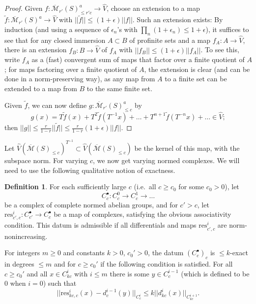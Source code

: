 \documentclass[11pt]{amsbook}
\renewcommand*{\tilde}{\widetilde}
\numberwithin{equation}{section}
\numberwithin{theorem}{section}
\theoremstyle{definition}
\newtheorem{definition}[theorem]{Definition}
\begin{document}
\begin{proof} Given $f: \overline{\mathcal M}_{r'}(S)_{\leq r'c}^a\to \widehat{V}$, choose an extension to a map $\tilde{f}: \overline{\mathcal M}_{r'}(S)^a\to \widehat{V}$ with $||\tilde{f}||\leq (1+\epsilon)||f||$. Such an extension exists: By induction (and using a sequence of $\epsilon_n$'s with $\prod_n (1+\epsilon_n)\leq 1+\epsilon$), it suffices to see that for any closed immersion $A\subset B$ of profinite sets and a map $f_A: A\to \widehat{V}$, there is an extension $f_B: B\to \widehat{V}$ of $f_A$ with $||f_B||\leq (1+\epsilon)||f_A||$. To see this, write $f_A$ as a (fast) convergent sum of maps that factor over a finite quotient of $A$; for maps factoring over a finite quotient of $A$, the extension is clear (and can be done in a norm-preserving way), as any map from $A$ to a finite set can be extended to a map from $B$ to the same finite set.

Given $\tilde{f}$, we can now define $g: \overline{\mathcal M}_{r'}(S)_{\leq c}^a$ by
\[
g(x) = T\tilde{f}(x)+T^2\tilde{f}(T^{-1}x)+\ldots+T^{n+1}\tilde{f}(T^{-n}x)+\ldots\in \widehat{V};
\]
then $||g||\leq \frac r{1-r}||\tilde{f}||\leq \frac r{1-r}(1+\epsilon)||f||$.
\end{proof}

Let $\widehat{V}(\overline{\mathcal M}(S)_{\leq c})^{T^{-1}}\subset \widehat{V}(\overline{\mathcal M}(S)_{\leq c})$ be the kernel of this map, with the subspace norm. For varying $c$, we now get varying normed complexes. We will need to use the following qualitative notion of exactness.

\begin{definition} For each sufficiently large $c$ (i.e.~all $c\geq c_0$ for some $c_0>0$), let
\[
C_c^\bullet: C_c^0\to C_c^1\to\ldots
\]
be a complex of complete normed abelian groups, and for $c'>c$, let $\mathrm{res}_{c',c}^i: C_{c'}^\bullet\to C_c^\bullet$ be a map of complexes, satisfying the obvious associativity condition. This datum is admissible if all differentials and maps $\mathrm{res}_{c',c}^i$ are norm-nonincreasing.

For integers $m\geq 0$ and constants $k>0$, $c_0'>0$, the datum $(C_c^\bullet)_c$ is $\leq k$-exact in degrees $\leq m$ and for $c\geq c_0'$ if the following condition is satisfied. For all $c\geq c_0'$ and all $x\in C_{kc}^i$ with $i\leq m$ there is some $y\in C_c^{i-1}$ (which is defined to be $0$ when $i=0$) such that
\[
||\mathrm{res}_{kc,c}^i(x)-d_c^{i-1}(y)||_{C_c^i}\leq k||d_{kc}^i(x)||_{C_{kc}^{i+1}}.
\]
\end{definition}
\end{document}
